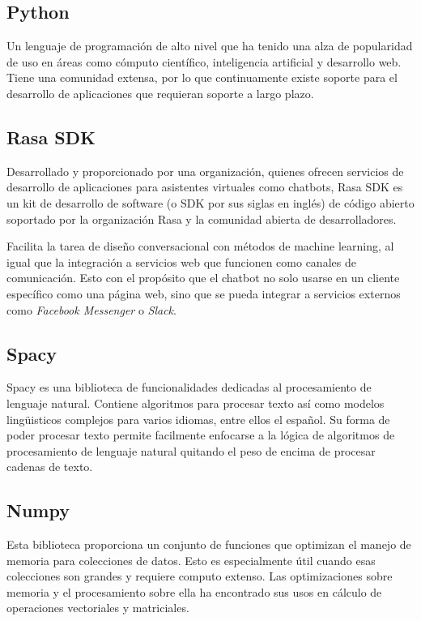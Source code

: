 \subsection{Python}

Un lenguaje de programación de alto nivel que ha tenido una alza de popularidad de uso en áreas como cómputo científico, inteligencia artificial y desarrollo web. Tiene una comunidad extensa, por lo que continuamente existe soporte para el desarrollo de aplicaciones que requieran soporte a largo plazo.

\subsection{Rasa SDK}

Desarrollado y proporcionado por una organización, quienes ofrecen servicios de desarrollo de aplicaciones para asistentes virtuales como chatbots, Rasa SDK es un kit de desarrollo de software (o SDK por sus siglas en inglés) de código abierto soportado por la organización Rasa y la comunidad abierta de desarrolladores.

Facilita la tarea de diseño conversacional con métodos de machine learning, al igual que la integración a servicios web que funcionen como canales de comunicación. Esto con el propósito que el chatbot no solo usarse en un cliente específico como una página web, sino que se pueda integrar a servicios externos como \textit{Facebook Messenger} o \textit{Slack}.

\subsection{Spacy}

Spacy es una biblioteca de funcionalidades dedicadas al procesamiento de lenguaje natural. Contiene algoritmos para procesar texto así como modelos lingüisticos complejos para varios idiomas, entre ellos el español. Su forma de poder procesar texto permite facilmente enfocarse a la lógica de algoritmos de procesamiento de lenguaje natural quitando el peso de encima de procesar cadenas de texto.


\subsection{Numpy}

Esta biblioteca proporciona un conjunto de funciones que optimizan el manejo de memoria para colecciones de datos. Esto es especialmente útil cuando esas colecciones son grandes y requiere computo extenso. Las optimizaciones sobre memoria y el procesamiento sobre ella ha encontrado sus usos en cálculo de operaciones vectoriales y matriciales.